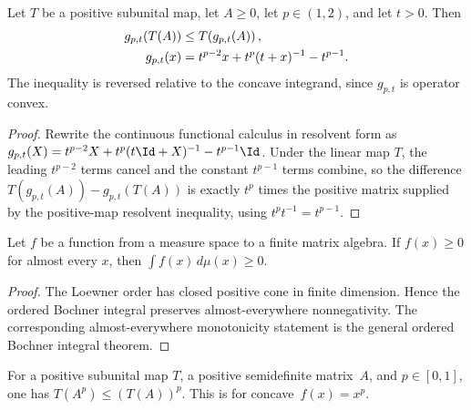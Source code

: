 \begin{lemma}
    \label{lem:operator_jensen_positive_map_rpow_integrand_convex}
    \leanok
    Let $T$ be a positive subunital map, let $A\ge0$, let
    $p\in(1,2)$, and let $t>0$. Then
    \begin{align}
        g_{p,t}(T(A))
        &\le T\!\left(g_{p,t}(A)\right), \notag\\
        g_{p,t}(x)
        &=t^{p-2}x+t^p(t+x)^{-1}-t^{p-1}.
        \notag
    \end{align}
    The inequality is reversed relative to the concave integrand, since
    $g_{p,t}$ is operator convex.
\end{lemma}

\begin{proof}
    \leanok
    Rewrite the continuous functional calculus in resolvent form as
    $g_{p,t}(X)=t^{p-2}X+t^p(t\Id+X)^{-1}-t^{p-1}\Id$.
    Under the linear map $T$, the leading $t^{p-2}$ terms cancel and the
    constant $t^{p-1}$ terms combine, so the difference
    $T(g_{p,t}(A))-g_{p,t}(T(A))$ is exactly $t^p$ times the positive matrix
    supplied by the positive-map resolvent inequality, using
    $t^pt^{-1}=t^{p-1}$.
\end{proof}

\begin{lemma}\label{lem:operator_jensen_integral_order}
    \leanok
    Let $f$ be a function from a measure space to a finite matrix algebra. If
    $f(x)\ge0$ for almost every $x$, then
    $\int f(x)\,d\mu(x)\ge0$.
\end{lemma}

\begin{proof}
    \leanok
    The Loewner order has closed positive cone in finite dimension. Hence the
    ordered Bochner integral preserves almost-everywhere nonnegativity. The
    corresponding almost-everywhere monotonicity statement is the general
    ordered Bochner integral theorem.
\end{proof}

\begin{theorem}\label{thm:posMap_rpow_concave_jensen}
    \leanok
    For a positive subunital map $T$, a positive semidefinite matrix~$A$,
    and $p\in[0,1]$, one has $T(A^p)\le(T(A))^p$.
    This is \cite[Theorem~5.13]{Wolf2012Quantum} for concave~$f(x)=x^p$.
\end{theorem}

